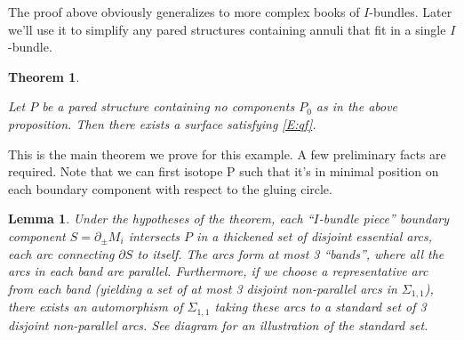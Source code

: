 \documentclass[12pt]{amsart}
\newtheorem{thm}[theorem]{Theorem}
\newtheorem{lemma}[theorem]{Lemma}
\theoremstyle{definition}
\theoremstyle{remark}
\newcommand{\bd}{\partial}
\newcommand{\Si}{\Sigma}
\begin{document}
The proof above obviously generalizes to more complex books of $I$-bundles.
Later we'll use it to simplify any pared structures containing annuli that fit
in a single $I$-bundle.

\begin{thm}\label{T:ex1}

Let $P$ be a pared structure containing no components $P_0$ as in the above
proposition. Then there exists a surface satisfying \eqref{E:qf}.

\end{thm}

This is the main theorem we prove for this example. A few preliminary facts are
required. Note that we can first isotope P such that it's in minimal position
on each boundary component with respect to the gluing circle.

\begin{lemma}

Under the hypotheses of the theorem, each ``$I$-bundle piece'' boundary
component $S=\bd_\pm M_i$ intersects $P$ in a thickened set of disjoint
essential arcs, each arc connecting $\bd S$ to itself. The arcs form at most
3 ``bands'', where all the arcs in each band are parallel.  Furthermore, if we
choose a representative arc from each band (yielding a set of at most
3 disjoint non-parallel arcs in $\Si_{1,1}$), there exists an automorphism of
$\Si_{1,1}$ taking these arcs to a standard set of 3 disjoint non-parallel
arcs.  See diagram for an illustration of the standard set.

\end{lemma}
\end{document}
